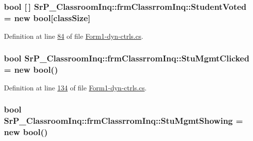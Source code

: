 \hypertarget{class_sr_p___classroom_inq_1_1frm_classrrom_inq_a1a7e4f2ef2b99a4a641431918fedf7f5}{
\subsubsection[{\-Student\-Voted}]{\setlength{\rightskip}{0pt plus 5cm}bool \mbox{[}$\,$\mbox{]} {\bf \-Sr\-P\-\_\-\-Classroom\-Inq\-::frm\-Classrrom\-Inq\-::\-Student\-Voted} = new bool\mbox{[}{\bf class\-Size}\mbox{]}}}
\label{class_sr_p___classroom_inq_1_1frm_classrrom_inq_a1a7e4f2ef2b99a4a641431918fedf7f5}


\-Definition at line \hyperlink{_form1-dyn-ctrls_8cs_source_l00084}{84} of file \hyperlink{_form1-dyn-ctrls_8cs_source}{\-Form1-\/dyn-\/ctrls.\-cs}.

\hypertarget{class_sr_p___classroom_inq_1_1frm_classrrom_inq_ad0a57ebb96913cfbb9622d8c4c7b52cb}{
\subsubsection[{\-Stu\-Mgmt\-Clicked}]{\setlength{\rightskip}{0pt plus 5cm}bool {\bf \-Sr\-P\-\_\-\-Classroom\-Inq\-::frm\-Classrrom\-Inq\-::\-Stu\-Mgmt\-Clicked} = new bool()}}
\label{class_sr_p___classroom_inq_1_1frm_classrrom_inq_ad0a57ebb96913cfbb9622d8c4c7b52cb}


\-Definition at line \hyperlink{_form1-dyn-ctrls_8cs_source_l00134}{134} of file \hyperlink{_form1-dyn-ctrls_8cs_source}{\-Form1-\/dyn-\/ctrls.\-cs}.

\hypertarget{class_sr_p___classroom_inq_1_1frm_classrrom_inq_a6a40312dc72ead57d8d40d415ee14a07}{
\subsubsection[{\-Stu\-Mgmt\-Showing}]{\setlength{\rightskip}{0pt plus 5cm}bool {\bf \-Sr\-P\-\_\-\-Classroom\-Inq\-::frm\-Classrrom\-Inq\-::\-Stu\-Mgmt\-Showing} = new bool()}}
\label{class_sr_p___classroom_inq_1_1frm_classrrom_inq_a6a40312dc72ead57d8d40d415ee14a07}


